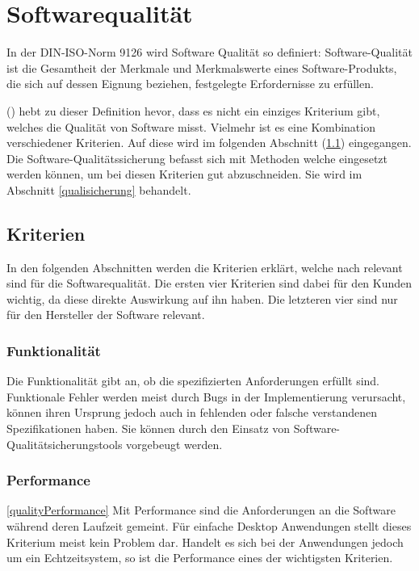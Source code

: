 
\section{Softwarequalität}\label{softwarequality}
In der DIN-ISO-Norm 9126 wird Software Qualität so definiert:
\dq Software-Qualität ist die Gesamtheit der Merkmale und Merkmalswerte eines Software-Produkts, die sich auf dessen Eignung beziehen, festgelegte Erfordernisse zu erfüllen.\dq

\citeauthor{hoffmann2013software} (\citeyear{hoffmann2013software}) hebt zu dieser Definition hevor, dass es nicht ein einziges Kriterium gibt, welches die Qualität von Software misst.
Vielmehr ist es eine Kombination verschiedener Kriterien.
Auf diese wird im folgenden Abschnitt (\ref{kriterien}) eingegangen.
Die Software-Qualitätssicherung befasst sich mit Methoden welche eingesetzt werden können, um bei diesen Kriterien gut abzuschneiden.
Sie wird im Abschnitt \ref{qualisicherung} behandelt.

\subsection{Kriterien}\label{kriterien}
In den folgenden Abschnitten werden die Kriterien erklärt, welche nach \citeauthor{hoffmann2013software} relevant sind für die Softwarequalität.
Die ersten vier Kriterien sind dabei für den Kunden wichtig, da diese direkte Auswirkung auf ihn haben.
Die letzteren vier sind nur für den Hersteller der Software relevant.

\subsubsection{Funktionalität}
Die Funktionalität gibt an, ob die spezifizierten Anforderungen erfüllt sind.
Funktionale Fehler werden meist durch Bugs in der Implementierung verursacht, können ihren Ursprung jedoch auch in fehlenden oder falsche verstandenen Spezifikationen haben.
Sie können durch den Einsatz von Software-Qualitätsicherungstools vorgebeugt werden.

\subsubsection{Performance}\ref{qualityPerformance}
Mit Performance sind die Anforderungen an die Software während deren Laufzeit gemeint.
Für einfache Desktop Anwendungen stellt dieses Kriterium meist kein Problem dar.
Handelt es sich bei der Anwendungen jedoch um ein Echtzeitsystem, so ist die Performance eines der wichtigsten Kriterien.

